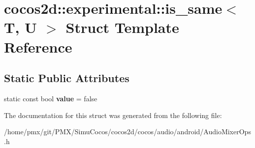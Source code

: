 \hypertarget{structcocos2d_1_1experimental_1_1is__same}{}\section{cocos2d\+:\+:experimental\+:\+:is\+\_\+same$<$ T, U $>$ Struct Template Reference}
\label{structcocos2d_1_1experimental_1_1is__same}
\subsection*{Static Public Attributes}
\begin{DoxyCompactItemize}
\item 
\mbox{\label{structcocos2d_1_1experimental_1_1is__same_aafe7cb1ec6d7bfd09941cfc66baf99f3}} 
static const bool {\bfseries value} = false
\end{DoxyCompactItemize}


The documentation for this struct was generated from the following file\+:\begin{DoxyCompactItemize}
\item 
/home/pmx/git/\+P\+M\+X/\+Simu\+Cocos/cocos2d/cocos/audio/android/Audio\+Mixer\+Ops.\+h\end{DoxyCompactItemize}
